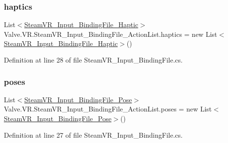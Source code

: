 \subsubsection{\texorpdfstring{haptics}{haptics}}
{\footnotesize\ttfamily List$<$\mbox{\hyperlink{class_valve_1_1_v_r_1_1_steam_v_r___input___binding_file___haptic}{Steam\+V\+R\+\_\+\+Input\+\_\+\+Binding\+File\+\_\+\+Haptic}}$>$ Valve.\+V\+R.\+Steam\+V\+R\+\_\+\+Input\+\_\+\+Binding\+File\+\_\+\+Action\+List.\+haptics = new List$<$\mbox{\hyperlink{class_valve_1_1_v_r_1_1_steam_v_r___input___binding_file___haptic}{Steam\+V\+R\+\_\+\+Input\+\_\+\+Binding\+File\+\_\+\+Haptic}}$>$()}



Definition at line 28 of file Steam\+V\+R\+\_\+\+Input\+\_\+\+Binding\+File.\+cs.

\mbox{\label{class_valve_1_1_v_r_1_1_steam_v_r___input___binding_file___action_list_a47e84a3fd123fcc43bcdb43c2772b36f}} 
\subsubsection{\texorpdfstring{poses}{poses}}
{\footnotesize\ttfamily List$<$\mbox{\hyperlink{class_valve_1_1_v_r_1_1_steam_v_r___input___binding_file___pose}{Steam\+V\+R\+\_\+\+Input\+\_\+\+Binding\+File\+\_\+\+Pose}}$>$ Valve.\+V\+R.\+Steam\+V\+R\+\_\+\+Input\+\_\+\+Binding\+File\+\_\+\+Action\+List.\+poses = new List$<$\mbox{\hyperlink{class_valve_1_1_v_r_1_1_steam_v_r___input___binding_file___pose}{Steam\+V\+R\+\_\+\+Input\+\_\+\+Binding\+File\+\_\+\+Pose}}$>$()}



Definition at line 27 of file Steam\+V\+R\+\_\+\+Input\+\_\+\+Binding\+File.\+cs.

\mbox{\label{class_valve_1_1_v_r_1_1_steam_v_r___input___binding_file___action_list_ada6c5b07362e5fa549318e3e6814f446}} 
